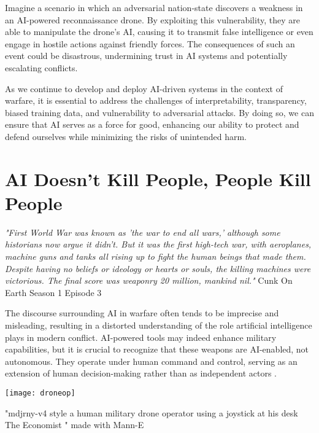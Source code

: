 Imagine a scenario in which an adversarial nation-state discovers a weakness in an AI-powered reconnaissance drone. By exploiting this vulnerability, they are able to manipulate the drone's AI, causing it to transmit false intelligence or even engage in hostile actions against friendly forces. The consequences of such an event could be disastrous, undermining trust in AI systems and potentially escalating conflicts.

As we continue to develop and deploy AI-driven systems in the context of warfare, it is essential to address the challenges of interpretability, transparency, biased training data, and vulnerability to adversarial attacks. By doing so, we can ensure that AI serves as a force for good, enhancing our ability to protect and defend ourselves while minimizing the risks of unintended harm.

\section{AI Doesn't Kill People, People Kill People}

\textit{"First World War was known as 'the war to end all wars,' although some historians now argue it didn't. But it was the first high-tech war, with aeroplanes, machine guns and tanks all rising up to fight the human beings that made them. Despite having no beliefs or ideology or hearts or souls, the killing machines were victorious. The final score was weaponry 20 million, mankind nil."} Cunk On Earth Season 1 Episode 3 \cite{cunkonearth}

The discourse surrounding AI in warfare often tends to be imprecise and misleading, resulting in a distorted understanding of the role artificial intelligence plays in modern conflict. AI-powered tools may indeed enhance military capabilities, but it is crucial to recognize that these weapons are AI-enabled, not autonomous. They operate under human command and control, serving as an extension of human decision-making rather than as independent actors \cite{aiwarfare}.

\begin{pdf}
\begin{marginfigure}[-5.5cm]
        \texttt{[image: droneop]}
        \caption{"mdjrny-v4 style a human military drone operator using a joystick at his desk The Economist " made with Mann-E}
\end{marginfigure}
\end{pdf}


